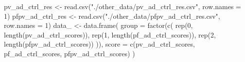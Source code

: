 \documentclass[
  11pt,
  oneside]{book}
\newenvironment{Shaded}{\begin{snugshade}}{\end{snugshade}}
\newcommand{\AttributeTok}[1]{\textcolor[rgb]{0.77,0.63,0.00}{#1}}
\newcommand{\DecValTok}[1]{\textcolor[rgb]{0.00,0.00,0.81}{#1}}
\newcommand{\FunctionTok}[1]{\textcolor[rgb]{0.00,0.00,0.00}{#1}}
\newcommand{\NormalTok}[1]{#1}
\newcommand{\OtherTok}[1]{\textcolor[rgb]{0.56,0.35,0.01}{#1}}
\newcommand{\StringTok}[1]{\textcolor[rgb]{0.31,0.60,0.02}{#1}}
\begin{document}
\begin{Shaded}
\begin{Highlighting}[]
\NormalTok{pv\_ad\_ctrl\_res }\OtherTok{\textless{}{-}} \FunctionTok{read.csv}\NormalTok{(}\StringTok{"./other\_data/pv\_ad\_ctrl\_res.csv"}\NormalTok{, }\AttributeTok{row.names =} \DecValTok{1}\NormalTok{)}
\NormalTok{pfpv\_ad\_ctrl\_res }\OtherTok{\textless{}{-}} \FunctionTok{read.csv}\NormalTok{(}\StringTok{"./other\_data/pfpv\_ad\_ctrl\_res.csv"}\NormalTok{, }\AttributeTok{row.names =} \DecValTok{1}\NormalTok{)}
\NormalTok{data\_ }\OtherTok{\textless{}{-}} \FunctionTok{data.frame}\NormalTok{(}
  \AttributeTok{group =} \FunctionTok{factor}\NormalTok{(}\FunctionTok{c}\NormalTok{(}
    \FunctionTok{rep}\NormalTok{(}\DecValTok{0}\NormalTok{, }\FunctionTok{length}\NormalTok{(pv\_ad\_ctrl\_scores)), }\FunctionTok{rep}\NormalTok{(}\DecValTok{1}\NormalTok{, }\FunctionTok{length}\NormalTok{(pf\_ad\_ctrl\_scores)),}
    \FunctionTok{rep}\NormalTok{(}\DecValTok{2}\NormalTok{, }\FunctionTok{length}\NormalTok{(pfpv\_ad\_ctrl\_scores))}
\NormalTok{  )),}
  \AttributeTok{score =} \FunctionTok{c}\NormalTok{(pv\_ad\_ctrl\_scores, pf\_ad\_ctrl\_scores, pfpv\_ad\_ctrl\_scores)}
\NormalTok{)}


\end{Highlighting}
\end{Shaded}
\end{document}
